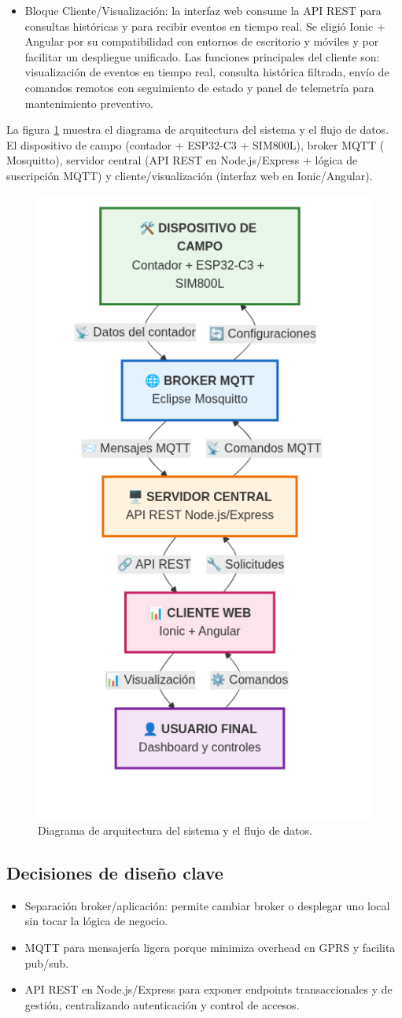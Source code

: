 \begin{itemize}
  \item {Bloque Cliente/Visualización:} la interfaz web consume la API REST para consultas históricas y para recibir eventos en tiempo real. Se eligió Ionic + Angular por su compatibilidad con entornos de escritorio y móviles y por facilitar un despliegue unificado. Las funciones principales del cliente son: visualización de eventos en tiempo real, consulta histórica filtrada, envío de comandos remotos con seguimiento de estado y panel de telemetría para mantenimiento preventivo.
\end{itemize}



La figura \ref{fig:diag_arquitectura} muestra el diagrama de arquitectura del sistema y el flujo de datos. 
El dispositivo de campo (contador + ESP32-C3 + SIM800L), broker MQTT ( Mosquitto),  servidor central (API REST en Node.js/Express + lógica de suscripción MQTT) y  cliente/visualización (interfaz web en Ionic/Angular).


\begin{figure}[htbp]
  \centering
  \includegraphics[width=0.4\linewidth]{./Figures/diagArq.png}
  \caption{Diagrama de arquitectura del sistema y el flujo de datos.}
  \label{fig:diag_arquitectura}
\end{figure}


\subsection{Decisiones de diseño clave}

\begin{itemize}

\item Separación broker/aplicación: permite cambiar broker o desplegar uno local sin tocar la lógica de negocio.

\item MQTT para mensajería ligera  porque minimiza overhead en GPRS y facilita pub/sub.

\item API REST en Node.js/Express para exponer endpoints transaccionales y de gestión, centralizando autenticación y control de accesos.
\end{itemize}




